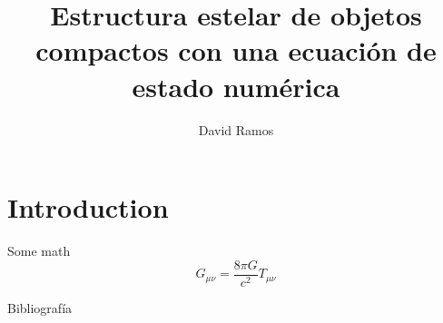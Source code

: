 \documentclass[11pt]{beamer}
\title[Estructura estelar de objetos compactos]{Estructura estelar de objetos compactos con una ecuación de estado numérica}
\author[David Ramos]{David Ramos}
\begin{document}
	\typesetFrontSlides

\section{Introduction}
\begin{frame}{Some math}
    \begin{equation}
        G_{\mu\nu}=\frac{8\pi G}{c^2} T_{\mu\nu}
    \end{equation}
\end{frame}


\begin{frame}{Bibliografía}

\end{frame}
\end{document}
